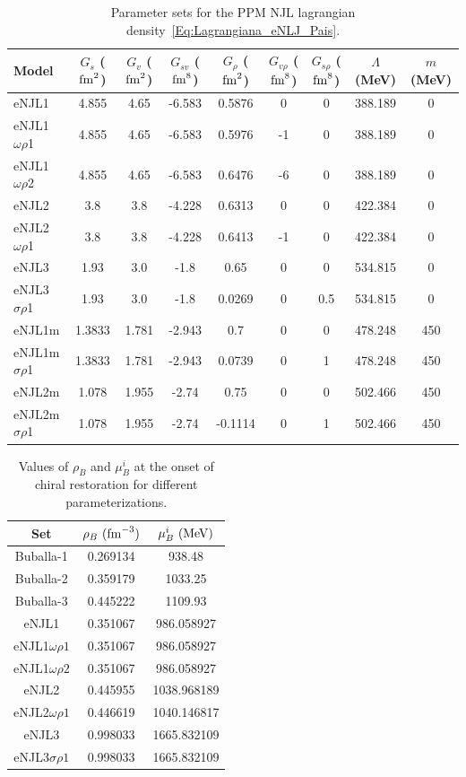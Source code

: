 \documentclass[prc, reprint, amsmath, floatfix,10pt]{revtex4-1}
\begin{document}
\begin{table}
\caption{Parameter sets for the PPM NJL lagrangian density~\eqref{Eq:Lagrangiana_eNLJ_Pais}\cite{Pais2016}. \label{Tab:Parametros_eNJL}}
\begin{ruledtabular}
\begin{tabular}{lcccccccc}
Model & $G_s$ ($\rm{fm}^2$) & $G_v$ ($\rm{fm}^2$) & $G_{sv}$ ($\rm{fm}^8$) & $G_\rho$ ($\rm{fm}^2$) & $G_{v\rho}$ ($\rm{fm}^8$) & $G_{s\rho}$ ($\rm{fm}^8$) & $\Lambda$ (MeV) & $m$ (MeV) \\
\hline
eNJL1 & 4.855 & 4.65 & -6.583 & 0.5876 & 0 & 0 & 388.189 & 0 \\
eNJL1$\omega\rho$1 & 4.855 & 4.65 & -6.583 & 0.5976 & -1 & 0 & 388.189 & 0 \\
eNJL1$\omega\rho$2 & 4.855 & 4.65 & -6.583 & 0.6476 & -6 & 0 & 388.189 & 0 \\
eNJL2 & 3.8 & 3.8 & -4.228 & 0.6313 & 0 & 0 & 422.384 & 0 \\
eNJL2$\omega\rho$1 & 3.8 & 3.8 & -4.228 & 0.6413 & -1 & 0 & 422.384 & 0 \\
eNJL3 & 1.93 & 3.0 & -1.8 & 0.65 & 0 & 0 & 534.815 & 0 \\
eNJL3$\sigma\rho$1 & 1.93 & 3.0 & -1.8 & 0.0269 & 0 & 0.5 & 534.815 & 0 \\
eNJL1m & 1.3833 & 1.781 & -2.943 & 0.7 & 0 & 0 & 478.248 & 450 \\
eNJL1m$\sigma\rho$1 & 1.3833 & 1.781 & -2.943 & 0.0739 & 0 & 1 & 478.248 & 450 \\
eNJL2m & 1.078 & 1.955 & -2.74 & 0.75 & 0 & 0 & 502.466 & 450 \\
eNJL2m$\sigma\rho$1 & 1.078 & 1.955 & -2.74 & -0.1114 & 0 & 1 & 502.466 & 450 \\
\end{tabular}
\end{ruledtabular}
\end{table}

\begin{table}
\caption{Values of $\rho_B$ and $\mu_B^i$ at the onset of chiral restoration for different parameterizations.}
\begin{ruledtabular}
\begin{tabular}{ccc}
Set & $\rho_B~(\rm{fm}^{-3})$ & $\mu_B^i~(\rm{MeV})$ \\
\hline
Buballa-1 & 0.269134 & 938.48 \\
Buballa-2 & 0.359179 & 1033.25 \\
Buballa-3 & 0.445222 & 1109.93 \\
eNJL1 & 0.351067 & 986.058927 \\
eNJL1$\omega\rho 1$ & 0.351067 & 986.058927 \\
eNJL1$\omega\rho 2$ & 0.351067 & 986.058927 \\
eNJL2 & 0.445955 & 1038.968189 \\
eNJL2$\omega\rho 1$ & 0.446619 & 1040.146817 \\
eNJL3 & 0.998033 & 1665.832109 \\
eNJL3$\sigma\rho 1$ & 0.998033 & 1665.832109 \\
\end{tabular}
\end{ruledtabular}
\end{table}
\end{document}
